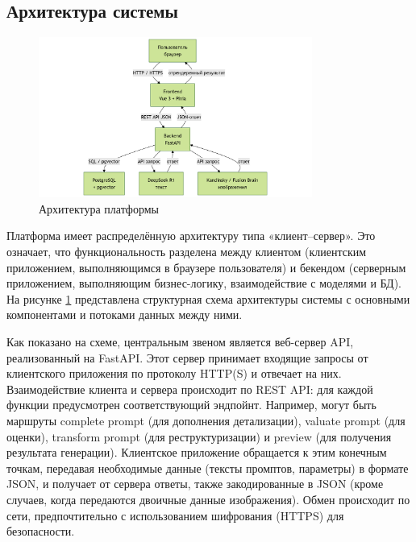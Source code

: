 \subsection{Архитектура системы}
\begin{figure}[htbp]
    \centering
    \includegraphics[width=0.8\textwidth]{picture/app-architecture.png}
    \caption{Архитектура платформы}\label{architecture}
\end{figure}
 Платформа имеет распределённую архитектуру типа «клиент–сервер». Это означает, что функциональность разделена между клиентом (клиентским приложением, выполняющимся в браузере пользователя) и бекендом (серверным приложением, выполняющим бизнес-логику, взаимодействие с моделями и БД). На рисунке \ref{architecture} представлена структурная схема архитектуры системы с основными компонентами и потоками данных между ними.

Как показано на схеме, центральным звеном является веб-сервер API, реализованный на FastAPI. Этот сервер принимает входящие запросы от клиентского приложения по протоколу HTTP(S) и отвечает на них. Взаимодействие клиента и сервера происходит по REST API: для каждой функции предусмотрен соответствующий эндпойнт. Например, могут быть маршруты complete prompt (для дополнения детализации), valuate prompt (для оценки), transform prompt (для реструктуризации) и preview (для получения результата генерации). Клиентское приложение обращается к этим конечным точкам, передавая необходимые данные (тексты промптов, параметры) в формате JSON, и получает от сервера ответы, также закодированные в JSON (кроме случаев, когда передаются двоичные данные изображения). Обмен происходит по сети, предпочтительно с использованием шифрования (HTTPS) для безопасности.

